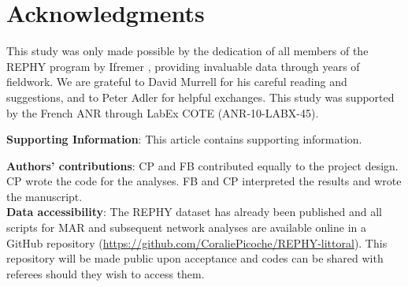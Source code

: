 \documentclass[10pt]{article}
\begin{document}
\section*{Acknowledgments}

This study was only made possible by the dedication of all members
of the REPHY program by Ifremer \citep{REPHY_db}, providing invaluable
data through years of fieldwork. We are grateful to David Murrell
for his careful reading and suggestions, and to Peter Adler for helpful
exchanges. This study was supported by the French ANR through LabEx
COTE (ANR-10-LABX-45).

\textbf{Supporting Information}: This article contains supporting information.

\textbf{Authors' contributions}: CP and FB contributed equally to
the project design. CP wrote the code for the analyses. FB and CP
interpreted the results and wrote the manuscript.\\

\textbf{Data accessibility}: The REPHY dataset has already been published
\citep{REPHY_db} and all scripts for MAR and subsequent network analyses
are available online in a GitHub repository (\url{https://github.com/CoraliePicoche/REPHY-littoral}).
This repository will be made public upon acceptance and codes can
be shared with referees should they wish to access them.

\nolinenumbers %
%
 

\end{document}
